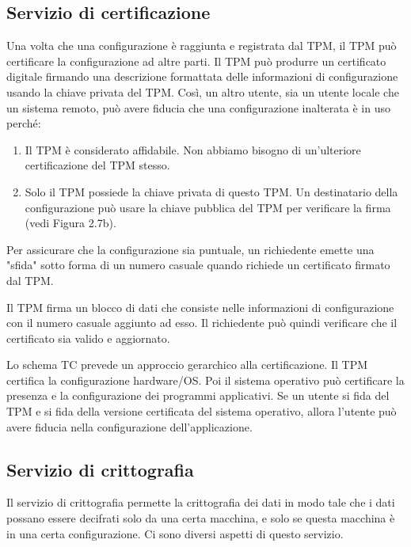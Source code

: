 \subsection{Servizio di certificazione}

Una volta che una configurazione è raggiunta e registrata dal TPM, il TPM può certificare la configurazione ad altre parti. Il TPM può produrre un certificato digitale firmando una descrizione formattata delle informazioni di configurazione usando la chiave privata del TPM. Così, un altro utente, sia un utente locale che un sistema remoto, può avere fiducia che una configurazione inalterata è in uso perché:

\begin{enumerate}
    \item Il TPM è considerato affidabile. Non abbiamo bisogno di un'ulteriore certificazione del TPM stesso.
    
    \item Solo il TPM possiede la chiave privata di questo TPM. Un destinatario della configurazione può usare la chiave pubblica del TPM per verificare la firma (vedi Figura 2.7b).
\end{enumerate}
Per assicurare che la configurazione sia puntuale, un richiedente emette una "sfida" sotto forma di un numero casuale quando richiede un certificato firmato dal TPM.

\singlespacing

Il TPM firma un blocco di dati che consiste nelle informazioni di configurazione con il numero casuale aggiunto ad esso. Il richiedente può quindi verificare che il certificato sia valido e aggiornato.

\singlespacing

Lo schema TC prevede un approccio gerarchico alla certificazione. Il TPM certifica la configurazione hardware/OS. Poi il sistema operativo può certificare la presenza e la configurazione dei programmi applicativi. Se un utente si fida del TPM e si fida della versione certificata del sistema operativo, allora l'utente può avere fiducia nella configurazione dell'applicazione.

\subsection{Servizio di crittografia}
Il servizio di crittografia permette la crittografia dei dati in modo tale che i dati possano essere decifrati solo da una certa macchina, e solo se questa macchina è in una certa configurazione. Ci sono diversi aspetti di questo servizio.

